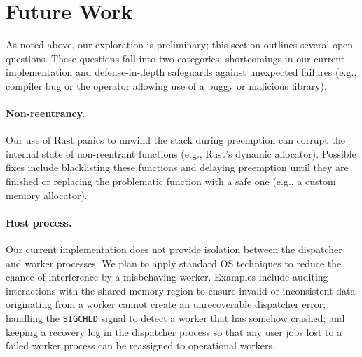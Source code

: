 \section{Future Work}
\label{sec:future}

As noted above, our exploration is preliminary; this section outlines several
open questions.  These questions fall into two categories: shortcomings in our
current implementation and defense-in-depth safeguards against unexpected
failures (e.g., compiler bug or the operator allowing use of a buggy or malicious library).


\paragraph{Non-reentrancy.}
Our use of Rust panics to unwind the stack during preemption can
corrupt the internal state of non-reentrant functions (e.g., Rust's dynamic
allocator).  Possible fixes include blacklisting these functions and delaying
preemption until they are finished or replacing the problematic function with a
safe one (e.g., a custom memory allocator).

\paragraph{Host process.}
Our current implementation does not provide isolation between the dispatcher
and worker processes.  We plan to apply standard OS techniques to reduce
the chance of interference by a misbehaving worker.  Examples
include auditing interactions with the shared memory region to ensure invalid
or inconsistent data originating from a worker cannot create an unrecoverable
dispatcher error; handling the \texttt{SIGCHLD} signal to detect a worker that has
somehow crashed; and keeping a recovery log in the dispatcher process so that any
user jobs lost to a failed worker process can be reassigned to operational
workers.  

